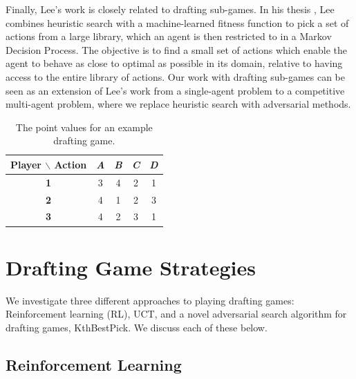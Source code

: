 \documentclass[letterpaper]{article}
\numberwithin{equation}{section}
\numberwithin{theorem}{section}
\numberwithin{lemma}{section}
\numberwithin{df}{section}
\begin{document}

Finally, Lee's work is closely related to drafting sub-games.  In his thesis \cite{GregLeeThesis}, Lee combines heuristic search with a machine-learned fitness function to pick a set of actions from a large library, which an agent is then restricted to in a Markov Decision Process.  The objective is to find a small set of actions which enable the agent to behave as close to optimal as possible in its domain, relative to having access to the entire library of actions.  Our work with drafting sub-games can be seen as an extension of Lee's work from a single-agent problem to a competitive multi-agent problem, where we replace heuristic search with adversarial methods. 

\begin{table}[t]
	\centering
		\caption{The point values for an example drafting game.}
		\label{tab:KthEx}
		\begin{footnotesize}
		\begin{tabular}{|c|c|c|c|c|}
			\hline
			\bf Player $\backslash$ Action & \bfseries {\em A} & \bfseries {\em B} & \bfseries {\em C} & \bfseries {\em D} \\
			\hline
			\bf 1 & 3 & 4 & 2 & 1 \\
			\hline
			\bf 2 & 4 & 1 & 2 & 3 \\
			\hline
			\bf 3 & 4 & 2 & 3 & 1 \\
			\hline
		\end{tabular}
		\end{footnotesize}
\end{table}

\section{Drafting Game Strategies}
\label{sec:drafting}

We investigate three different approaches to playing drafting games: Reinforcement learning (RL), UCT, and a novel adversarial search algorithm for drafting games, KthBestPick.  We discuss each of these below.

\subsection{Reinforcement Learning}
\end{document}
